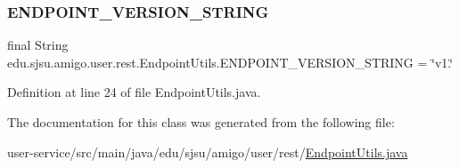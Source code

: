 \subsubsection{\texorpdfstring{E\+N\+D\+P\+O\+I\+N\+T\+\_\+\+V\+E\+R\+S\+I\+O\+N\+\_\+\+S\+T\+R\+I\+NG}{ENDPOINT\_VERSION\_STRING}}
{\footnotesize\ttfamily final String edu.\+sjsu.\+amigo.\+user.\+rest.\+Endpoint\+Utils.\+E\+N\+D\+P\+O\+I\+N\+T\+\_\+\+V\+E\+R\+S\+I\+O\+N\+\_\+\+S\+T\+R\+I\+NG = \char`\"{}v1.\char`\"{}\hspace{0.3cm}{\ttfamily [static]}}



Definition at line 24 of file Endpoint\+Utils.\+java.



The documentation for this class was generated from the following file\+:\begin{DoxyCompactItemize}
\item 
user-\/service/src/main/java/edu/sjsu/amigo/user/rest/\hyperlink{_endpoint_utils_8java}{Endpoint\+Utils.\+java}\end{DoxyCompactItemize}
